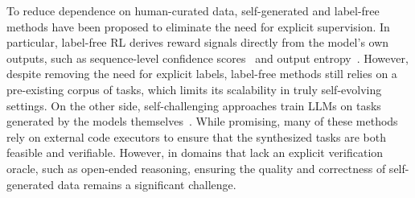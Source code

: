 To reduce dependence on human-curated data, self-generated and label-free methods have been proposed to eliminate the need for explicit supervision. In particular, label-free RL derives reward signals directly from the model's own outputs, such as sequence-level confidence scores~\citep{Li2025ConfidenceIA, Prabhudesai2025MaximizingCA, Huang2025EfficientTestTimeScalingSelfCalibration} and output entropy~\citep{Agarwal2025TheUE,Cheng2025ReasoningWE}.
However, despite removing the need for explicit labels, label-free methods still relies on a pre-existing corpus of tasks, which limits its scalability in truly self-evolving settings.
On the other side, self-challenging approaches train LLMs on tasks generated by the models themselves~\citep{Zhou2025SelfChallengingLM,Wang2025CoEvolvingLC,Zhao2025AbsoluteZR}.
While promising, many of these methods rely on external code executors to ensure that the synthesized tasks are both feasible and verifiable. However, in domains that lack an explicit verification oracle, such as open-ended reasoning, ensuring the quality and correctness of self-generated data remains a significant challenge.

